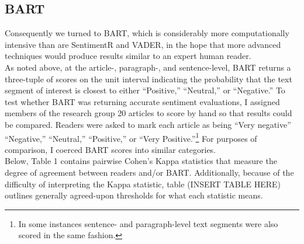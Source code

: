 \documentclass[11pt, letterpaper, twoside]{article}
\begin{document}
    \subsection{BART}
        Consequently we turned to BART, which is considerably more computationally intensive than are SentimentR and VADER, in the hope that more advanced techniques would produce results similar to an expert human reader.\\

        As noted above, at the article-, paragraph-, and sentence-level, BART returns a three-tuple of scores on the unit interval indicating the probability that the text segment of interest is closest to either ``Positive,'' ``Neutral,'' or ``Negative.'' To test whether BART was returning accurate sentiment evaluations, I assigned members of the research group 20 articles to score by hand so that results could be compared. Readers were asked to mark each article as being ``Very negative'' ``Negative,'' ``Neutral,'' ``Positive,'' or ``Very Positive.''\footnote{In some instances sentence- and paragraph-level text segments were also scored in the same fashion.} For purposes of comparison, I coerced BART scores into similar categories.\\

        Below, Table 1 contains pairwise Cohen's Kappa statistics that measure the degree of agreement between readers and/or BART. Additionally, because of the difficulty of interpreting the Kappa statistic, table (INSERT TABLE HERE) outlines generally agreed-upon thresholds for what each statistic means.
\end{document}
